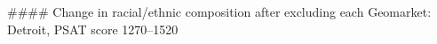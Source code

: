 #### Change in racial/ethnic composition after excluding each Geomarket: Detroit, PSAT score 1270–1520
